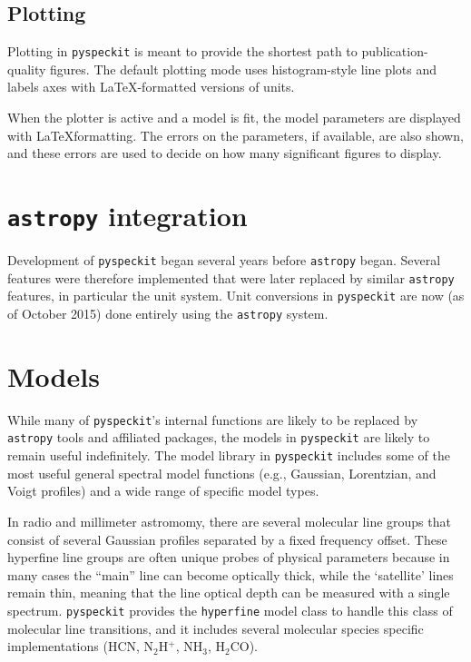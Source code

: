 \documentclass[twocolumn]{aastex61}
\newcommand{\pyspeckit}{\texttt{pyspeckit}\xspace}
\newcommand{\astropy}{\texttt{astropy}\xspace}
\begin{document}
\subsection{Plotting}
Plotting in \pyspeckit is meant to provide the shortest path to
publication-quality figures.  The default plotting mode uses histogram-style
line plots and labels axes with \LaTeX-formatted versions of units.

When the plotter is active and a model is fit, the model parameters are
displayed with \LaTeX formatting.  The errors on the parameters, if available,
are also shown, and these errors are used to decide on how many significant
figures to display.

\section{\astropy integration}
Development of \pyspeckit began several years before \astropy began.  Several
features were therefore implemented that were later replaced by similar
\astropy features, in particular the unit system.  Unit conversions in
\pyspeckit are now (as of October 2015) done entirely using the \astropy
system.

\section{Models}
While many of \pyspeckit's internal functions are likely to be replaced by
\astropy tools and affiliated packages, the models in \pyspeckit are likely to
remain useful indefinitely.  The model library in \pyspeckit includes some of
the most useful general spectral model functions (e.g., Gaussian, Lorentzian,
and Voigt profiles) and a wide range of specific model types.

In radio and millimeter astromomy, there are several molecular line groups that
consist of several Gaussian profiles separated by a fixed frequency offset.
These hyperfine line groups are often unique probes of physical parameters
because in many cases the ``main'' line can become optically thick, while the
`satellite' lines remain thin, meaning that the line optical depth can be
measured with a single spectrum.  \pyspeckit provides the \texttt{hyperfine}
model class to handle this class of molecular line transitions, and it includes
several molecular species specific implementations (HCN, N$_2$H$^+$, NH$_3$,
H$_2$CO).
\end{document}
